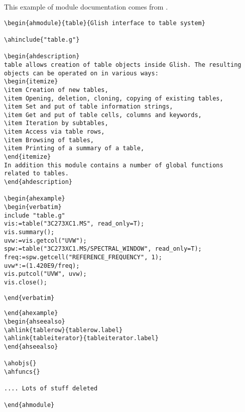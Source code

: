 \label{197:module_example}
This example of module documentation comes from
.
\begin{verbatim}
\begin{ahmodule}{table}{Glish interface to table system}

\ahinclude{"table.g"}

\begin{ahdescription}
table allows creation of table objects inside Glish. The resulting
objects can be operated on in various ways:
\begin{itemize}
\item Creation of new tables,
\item Opening, deletion, cloning, copying of existing tables,
\item Set and put of table information strings,
\item Get and put of table cells, columns and keywords,
\item Iteration by subtables,
\item Access via table rows,
\item Browsing of tables,
\item Printing of a summary of a table,
\end{itemize}
In addition this module contains a number of global functions
related to tables.
\end{ahdescription}

\begin{ahexample}
\begin{verbatim}
include "table.g"
vis:=table("3C273XC1.MS", read_only=T);
vis.summary();
uvw:=vis.getcol("UVW");
spw:=table("3C273XC1.MS/SPECTRAL_WINDOW", read_only=T);
freq:=spw.getcell("REFERENCE_FREQUENCY", 1);
uvw*:=(1.420E9/freq);
vis.putcol("UVW", uvw);
vis.close();
\end{verbatim}
\verb!\end{verbatim}!
\begin{verbatim}
\end{ahexample}
\begin{ahseealso}
\ahlink{tablerow}{tablerow.label}
\ahlink{tableiterator}{tableiterator.label}
\end{ahseealso}

\ahobjs{}
\ahfuncs{}

.... Lots of stuff deleted

\end{ahmodule}
\end{verbatim}
